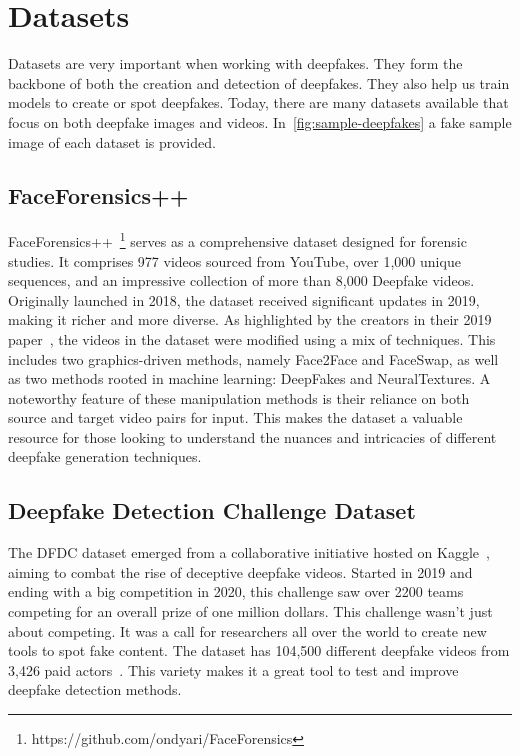 \section{Datasets}
Datasets are very important when working with deepfakes. They form the backbone of both
the creation and detection of deepfakes. They also help us train models to create or spot
deepfakes. Today, there are many datasets available that focus on both deepfake images
and videos. In~\autoref{fig:sample-deepfakes} a fake sample image of each dataset is provided.

\subsection{FaceForensics++}\label{section:ff++}
FaceForensics++~\footnote{https://github.com/ondyari/FaceForensics} serves as a comprehensive dataset designed for forensic studies. It
comprises 977 videos sourced from YouTube, over 1,000 unique sequences, and an
impressive collection of more than 8,000 Deepfake videos. Originally launched in
2018, the dataset received significant updates in 2019, making it richer and more
diverse. As highlighted by the creators in their 2019 paper~\cite{roessler2019faceforensicspp},
the videos in the dataset were modified using a mix of techniques. This includes two
graphics-driven methods, namely Face2Face and FaceSwap, as well as two methods rooted
in machine learning: DeepFakes and NeuralTextures. A noteworthy feature of these
manipulation methods is their reliance on both source and target video pairs for input.
This makes the dataset a valuable resource for those looking to understand the
nuances and intricacies of different deepfake generation techniques.

\subsection{Deepfake Detection Challenge Dataset}
The \ac{DFDC} dataset emerged from a collaborative initiative hosted on Kaggle~\cite{kaggle2020},
aiming to combat the rise of deceptive deepfake videos. Started in 2019 and ending
with a big competition in 2020, this challenge saw over 2200 teams competing for an
overall prize of one million dollars. This challenge wasn't just about competing.
It was a call for researchers all over the world to create new tools to spot fake
content. The dataset has 104,500 different deepfake videos from 3,426 paid
actors~\cite{dolhansky2020deepfake}. This variety makes it a great tool to test and improve deepfake detection
methods.

